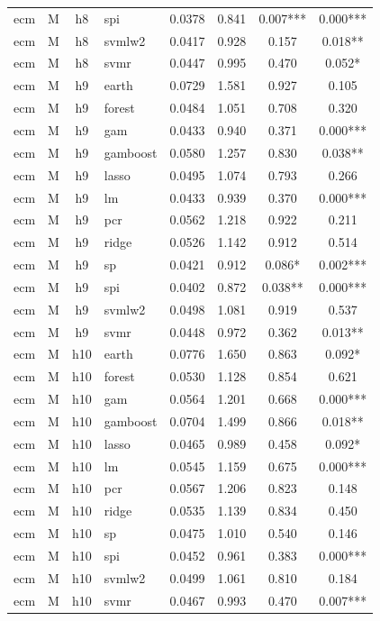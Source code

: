 \begin{ThreePartTable}
\begin{longtable}[t]{llclcccc}
ecm & M & h8 & spi & 0.0378 & 0.841 & 0.007*** & 0.000***\\
ecm & M & h8 & svmlw2 & 0.0417 & 0.928 & 0.157 & 0.018**\\
ecm & M & h8 & svmr & 0.0447 & 0.995 & 0.470 & 0.052*\\
\addlinespace
ecm & M & h9 & earth & 0.0729 & 1.581 & 0.927 & 0.105\\
ecm & M & h9 & forest & 0.0484 & 1.051 & 0.708 & 0.320\\
ecm & M & h9 & gam & 0.0433 & 0.940 & 0.371 & 0.000***\\
ecm & M & h9 & gamboost & 0.0580 & 1.257 & 0.830 & 0.038**\\
ecm & M & h9 & lasso & 0.0495 & 1.074 & 0.793 & 0.266\\
ecm & M & h9 & lm & 0.0433 & 0.939 & 0.370 & 0.000***\\
ecm & M & h9 & pcr & 0.0562 & 1.218 & 0.922 & 0.211\\
ecm & M & h9 & ridge & 0.0526 & 1.142 & 0.912 & 0.514\\
ecm & M & h9 & sp & 0.0421 & 0.912 & 0.086* & 0.002***\\
ecm & M & h9 & spi & 0.0402 & 0.872 & 0.038** & 0.000***\\
ecm & M & h9 & svmlw2 & 0.0498 & 1.081 & 0.919 & 0.537\\
ecm & M & h9 & svmr & 0.0448 & 0.972 & 0.362 & 0.013**\\
\addlinespace
ecm & M & h10 & earth & 0.0776 & 1.650 & 0.863 & 0.092*\\
ecm & M & h10 & forest & 0.0530 & 1.128 & 0.854 & 0.621\\
ecm & M & h10 & gam & 0.0564 & 1.201 & 0.668 & 0.000***\\
ecm & M & h10 & gamboost & 0.0704 & 1.499 & 0.866 & 0.018**\\
ecm & M & h10 & lasso & 0.0465 & 0.989 & 0.458 & 0.092*\\
ecm & M & h10 & lm & 0.0545 & 1.159 & 0.675 & 0.000***\\
ecm & M & h10 & pcr & 0.0567 & 1.206 & 0.823 & 0.148\\
ecm & M & h10 & ridge & 0.0535 & 1.139 & 0.834 & 0.450\\
ecm & M & h10 & sp & 0.0475 & 1.010 & 0.540 & 0.146\\
ecm & M & h10 & spi & 0.0452 & 0.961 & 0.383 & 0.000***\\
ecm & M & h10 & svmlw2 & 0.0499 & 1.061 & 0.810 & 0.184\\
ecm & M & h10 & svmr & 0.0467 & 0.993 & 0.470 & 0.007***\\

\end{longtable}
\end{ThreePartTable}
